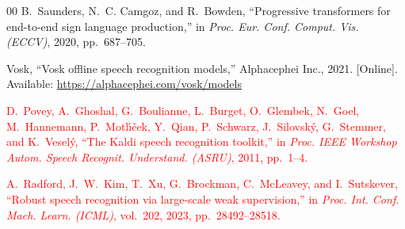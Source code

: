 \documentclass[conference,a4paper,10pt]{IEEEtran}
\begin{document}
\begin{thebibliography}{00}
B.~Saunders, N.~C. Camgoz, and R.~Bowden, ``Progressive transformers for end-to-end sign language production,'' in \emph{Proc. Eur. Conf. Comput. Vis. (ECCV)}, 2020, pp.~687--705.

Vosk, ``Vosk offline speech recognition models,'' Alphacephei Inc., 2021. [Online]. Available: \url{https://alphacephei.com/vosk/models}

\textcolor{red}{D.~Povey, A.~Ghoshal, G.~Boulianne, L.~Burget, O.~Glembek, N.~Goel, M.~Hannemann, P.~Motl{\'\i}{\v{c}}ek, Y.~Qian, P.~Schwarz, J.~Silovsk{\'y}, G.~Stemmer, and K.~Vesel{\'y}, ``The Kaldi speech recognition toolkit,'' in \emph{Proc. IEEE Workshop Autom. Speech Recognit. Understand. (ASRU)}, 2011, pp.~1--4.}

\textcolor{red}{A.~Radford, J.~W.~Kim, T.~Xu, G.~Brockman, C.~McLeavey, and I.~Sutskever, ``Robust speech recognition via large-scale weak supervision,'' in \emph{Proc. Int. Conf. Mach. Learn. (ICML)}, vol.~202, 2023, pp.~28492--28518.}

\end{thebibliography}
\end{document}
